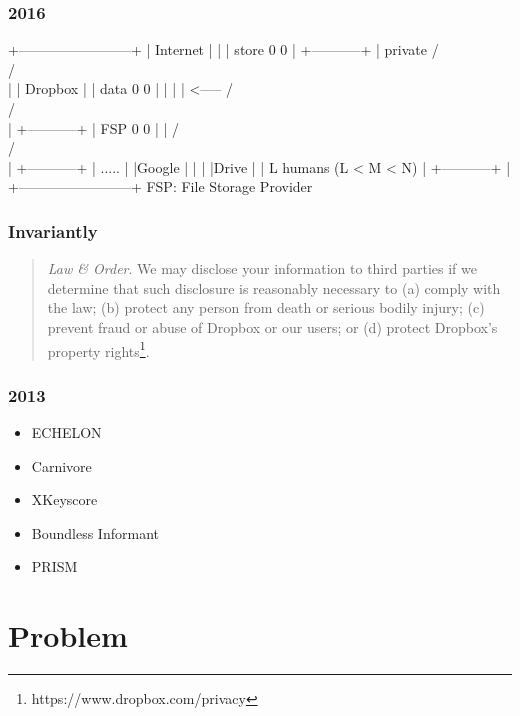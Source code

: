\documentclass[17pt]{beamer}
\begin{document}
\begin{frame}[fragile]
  \frametitle{2016}
  {\scriptsize
  \begin{semiverbatim}
   +------------------------+
   | Internet               |
   |                        | store    0   0
   |  +-----------+         | private / \\ / \\
   |  | Dropbox   |         |  data    0   0
   |  |           |         | <-----  / \\ / \\
   |  +-----------+         |   FSP    0   0
   |                        |         / \\ / \\
   |          +-----------+ |          .....
   |          |Google     | |
   |          |Drive      | |             L humans (L < M < N)
   |          +-----------+ |
   +------------------------+      FSP: File Storage Provider
  \end{semiverbatim}
  }
\end{frame}

\begin{frame}
  \frametitle{Invariantly}
  {\small
  \begin{quote}
    \emph{Law \& Order}. We may disclose your information to third
    parties if we determine that such disclosure is reasonably
    necessary to (a) comply with the law; (b) protect any person from
    death or serious bodily injury; (c) prevent fraud or abuse of
    Dropbox or our users; or (d) protect Dropbox's property
    rights\footnote{https://www.dropbox.com/privacy}.
  \end{quote}
  }
\end{frame}

\begin{frame}
  \frametitle{2013}

  \begin{itemize}
  \item ECHELON
  \item Carnivore
  \item XKeyscore
  \item Boundless Informant
  \item PRISM
  \end{itemize}
\end{frame}

\section{Problem}
\end{document}
